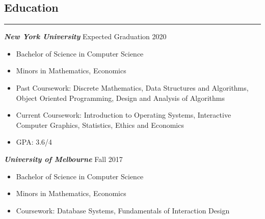 \documentclass[line, margin]{res}
\begin{document}
\address{63 Wall St. \#616\\ New York, NY 10005\\ (650) 793-7646}
\address{linkedin.com/in/samwaln\\ github.com/samwaln}
\begin{resume}


\section{Education}
\vspace{.3em}
\hspace{-9.8em}
\rule{6.5in}{0.5pt}
\textit{\upshape \textbf{New York University}} \hfill Expected Graduation 2020
\begin{itemize}[noitemsep,nolistsep]
\item Bachelor of Science in Computer Science
\item Minors in Mathematics, Economics
\item Past Coursework: Discrete Mathematics, Data Structures and Algorithms, Object Oriented Programming, Design and Analysis of Algorithms
\item Current Coursework: Introduction to Operating Systems, Interactive Computer Graphics, Statistics, Ethics and Economics
\item GPA: 3.6/4
\end{itemize}
\textit{\upshape \textbf{University of Melbourne}} \hfill Fall 2017
\begin{itemize}[noitemsep,nolistsep]
\item Bachelor of Science in Computer Science
\item Minors in Mathematics, Economics
\item Coursework: Database Systems, Fundamentals of Interaction Design
\end{itemize}


\end{resume}
\end{document}
